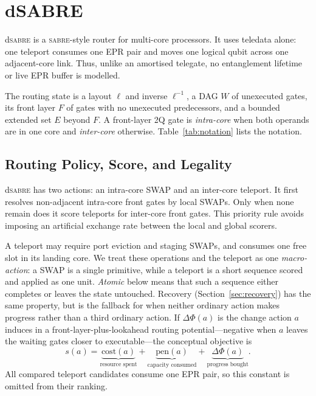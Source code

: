 \documentclass[journal]{IEEEtran}
\newcommand{\dSABRE}{d\textsc{sabre}}
\newcommand{\SABRE}{\textsc{sabre}}
\begin{document}
\section{dSABRE}
\label{sec:dsabre}

\dSABRE{} is a \SABRE{}-style router for multi-core processors. It uses teledata alone: one teleport consumes one EPR pair and moves one logical qubit across one adjacent-core link. Thus, unlike an amortised telegate, no entanglement lifetime or live EPR buffer is modelled.

The routing state is a layout $\ell$ and inverse $\ell^{-1}$, a DAG $W$ of unexecuted gates, its front layer $F$ of gates with no unexecuted predecessors, and a bounded extended set $E$ beyond $F$. A front-layer 2Q gate is \emph{intra-core} when both operands are in one core and \emph{inter-core} otherwise. Table~\ref{tab:notation} lists the notation.

\subsection{Routing Policy, Score, and Legality}
\label{sec:principle}

\dSABRE{} has two actions: an intra-core SWAP and an inter-core teleport. It first resolves non-adjacent intra-core front gates by local SWAPs. Only when none remain does it score teleports for inter-core front gates. This priority rule avoids imposing an artificial exchange rate between the local and global scorers.

A teleport may require port eviction and staging SWAPs, and consumes one free slot in its landing core. We treat these operations and the teleport as one \emph{macro-action}: a SWAP is a single primitive, while a teleport is a short sequence scored and applied as one unit. \emph{Atomic} below means that such a sequence either completes or leaves the state untouched. Recovery (Section~\ref{sec:recovery}) has the same property, but is the fallback for when neither ordinary action makes progress rather than a third ordinary action. If $\Delta\Phi(a)$ is the change action $a$ induces in a front-layer-plus-lookahead routing potential---negative when $a$ leaves the waiting gates closer to executable---the conceptual objective is
\begin{equation}
s(a)=\underbrace{\mathrm{cost}(a)}_{\text{resource spent}}
+\underbrace{\mathrm{pen}(a)}_{\text{capacity consumed}}
+\underbrace{\Delta\Phi(a)}_{\text{progress bought}}.
\label{eq:principle}
\end{equation}
All compared teleport candidates consume one EPR pair, so this constant is omitted from their ranking.
\end{document}
